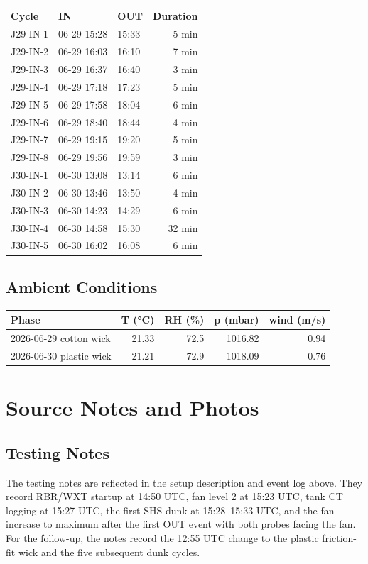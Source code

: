 \documentclass[11pt,letterpaper]{article}
\begin{document}
\begin{center}
\begin{tabular}{lllr}
\toprule
Cycle & IN & OUT & Duration \\
\midrule
J29-IN-1 & 06-29 15:28 & 15:33 & 5 min \\
J29-IN-2 & 06-29 16:03 & 16:10 & 7 min \\
J29-IN-3 & 06-29 16:37 & 16:40 & 3 min \\
J29-IN-4 & 06-29 17:18 & 17:23 & 5 min \\
J29-IN-5 & 06-29 17:58 & 18:04 & 6 min \\
J29-IN-6 & 06-29 18:40 & 18:44 & 4 min \\
J29-IN-7 & 06-29 19:15 & 19:20 & 5 min \\
J29-IN-8 & 06-29 19:56 & 19:59 & 3 min \\
J30-IN-1 & 06-30 13:08 & 13:14 & 6 min \\
J30-IN-2 & 06-30 13:46 & 13:50 & 4 min \\
J30-IN-3 & 06-30 14:23 & 14:29 & 6 min \\
J30-IN-4 & 06-30 14:58 & 15:30 & 32 min \\
J30-IN-5 & 06-30 16:02 & 16:08 & 6 min \\
\bottomrule
\end{tabular}
\end{center}

\subsection*{Ambient Conditions}

\begin{center}
\begin{tabular}{lrrrr}
\toprule
Phase & T (\si{\degreeCelsius}) & RH (\%) & p (mbar) & wind (m/s) \\
\midrule
2026-06-29 cotton wick & 21.33 & 72.5 & 1016.82 & 0.94 \\
2026-06-30 plastic wick & 21.21 & 72.9 & 1018.09 & 0.76 \\
\bottomrule
\end{tabular}
\end{center}

\section{Source Notes and Photos}

\subsection*{Testing Notes}
The testing notes are reflected in the setup description and event log above.
They record RBR/WXT startup at 14:50 UTC, fan level 2 at 15:23 UTC, tank CT
logging at 15:27 UTC, the first SHS dunk at 15:28--15:33 UTC, and the fan
increase to maximum after the first OUT event with both probes facing the fan.
For the follow-up, the notes record the 12:55 UTC change to the plastic
friction-fit wick and the five subsequent dunk cycles.
\end{document}
